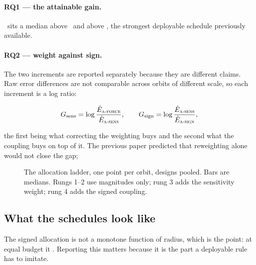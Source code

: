 \paragraph{RQ1 --- the attainable gain.}  \Asign\ sits a
median  above \Fop\ and  above \Rint, the strongest
deployable schedule previously available. 


\paragraph{RQ2 --- weight against sign.} The two increments are reported
separately because they are different claims. Raw error differences are not
comparable across orbits of different scale, so each increment is a log ratio:

\begin{equation}
  G_{\mathrm{sens}} = \log\frac{\hat E_{\textsc{a-force}}}{\hat E_{\textsc{a-sens}}},
  \qquad
  G_{\mathrm{sign}} = \log\frac{\hat E_{\textsc{a-sens}}}{\hat E_{\textsc{a-sign}}} ,
  \label{eq:increments}
\end{equation}

the first being what correcting the weighting buys and the second what the
coupling buys on top of it.  The previous paper predicted that reweighting alone would not close the
gap; 

\begin{figure}[!tbp]
  \centering
  \caption{The allocation ladder, one point per orbit, designs pooled. Bars are
  medians. Rungs 1--2 use magnitudes only; rung 3 adds the sensitivity weight;
  rung 4 adds the signed coupling.}
  \label{fig:ladder}
\end{figure}

\subsection{What the schedules look like}

 The signed allocation is not a monotone function
of radius, which is the point: at equal budget it . Reporting this matters because it is the part a deployable rule
has to imitate.

